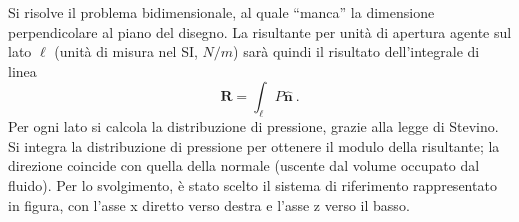 \parttwo
 Si risolve il problema bidimensionale, al quale ``manca'' la dimensione perpendicolare al piano del disegno. La risultante per unità di apertura agente sul lato $\ell$ (unità di misura nel SI, $N/m$) sarà quindi il risultato dell'integrale di linea
\begin{equation}
   \bm{R} = \int_{\ell} P \bm{\hat{n}} \ .
\end{equation} 
 Per ogni lato si calcola la distribuzione di pressione, grazie alla legge di Stevino. Si integra la distribuzione di pressione per ottenere il modulo della risultante; la direzione coincide con quella della normale (uscente dal volume occupato dal fluido).
Per lo svolgimento, è stato scelto il sistema di riferimento rappresentato in figura, con l'asse x diretto verso destra e l'asse z verso il basso.

\begin{itemize}


\end{itemize}

